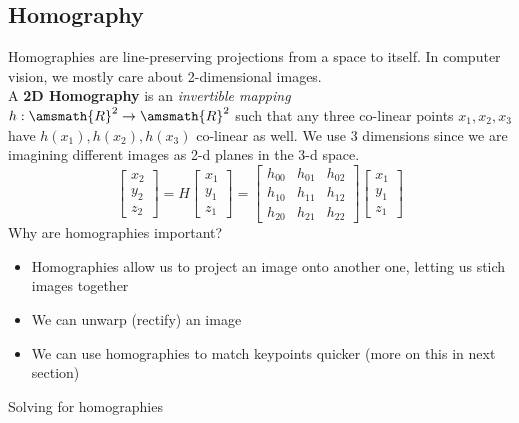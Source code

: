 \documentclass{article}
\begin{document}
\subsection{Homography}
Homographies are line-preserving projections from a space to itself. In computer vision, we mostly care about 2-dimensional images. \\A \textbf{2D Homography} is an \textit{invertible mapping} $h: \amsmath{R}^2 \rightarrow \amsmath{R}^2$ such that any three co-linear points $x_1,x_2,x_3$ have  $h(x_1),h(x_2),h(x_3)$ co-linear as well. We use 3 dimensions since we are imagining different images as 2-d planes in the 3-d space. 
$$\begin{bmatrix}
x_2\\y_2\\z_2
\end{bmatrix} = H \begin{bmatrix}
x_1\\y_1\\z_1
\end{bmatrix} = \begin{bmatrix}
h_{00} & h_{01} & h_{02}\\
h_{10} & h_{11} & h_{12}\\
h_{20} & h_{21} & h_{22}
\end{bmatrix}\begin{bmatrix}
x_1\\y_1\\z_1
\end{bmatrix}$$
Why are homographies important?
\begin{itemize}
    \item Homographies allow us to project an image onto another one, letting us stich images together
    \item We can unwarp (rectify) an image 
    \item We can use homographies to match keypoints quicker (more on this in next section)
\end{itemize}
Solving for homographies
\end{document}
